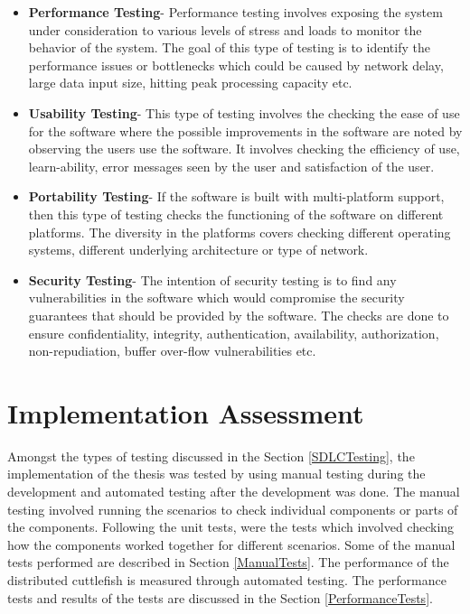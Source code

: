 \begin{itemize}
\item{\textbf{Performance Testing}}- Performance testing involves exposing the system under consideration to various levels of stress and loads to monitor the behavior of the system. The goal of this type of testing is to identify the performance issues or bottlenecks which could be caused by network delay, large data input size, hitting peak processing capacity etc.  
\item{\textbf{Usability Testing}}- This type of testing involves the checking the ease of use for the software where the possible improvements in the software are noted by observing the users use the software. It involves checking the efficiency of use, learn-ability, error messages seen by the user and satisfaction of the user.
\item{\textbf{Portability Testing}}- If the software is built with multi-platform support, then this type of testing checks the functioning of the software on different platforms. The diversity in the platforms covers checking different operating systems, different underlying architecture or type of network.    
\item{\textbf{Security Testing}}- The intention of security testing is to find any vulnerabilities in the software which would compromise the security guarantees that should be provided by the software. The checks are done to ensure confidentiality, integrity, authentication, availability, authorization, non-repudiation, buffer over-flow vulnerabilities etc. 
\end{itemize} 

\section{Implementation Assessment}

Amongst the types of testing discussed in the Section \ref{SDLCTesting}, the implementation of the thesis was tested by using manual testing during the development and automated testing after the development was done. The manual testing involved running the scenarios to check individual components or parts of the components.  
Following the unit tests, were the tests which involved checking how the components worked together for different scenarios. Some of the manual tests performed are described in Section \ref{ManualTests}. The performance of the distributed cuttlefish is measured through automated testing. The performance tests and results of the tests are discussed in the Section \ref{PerformanceTests}.

